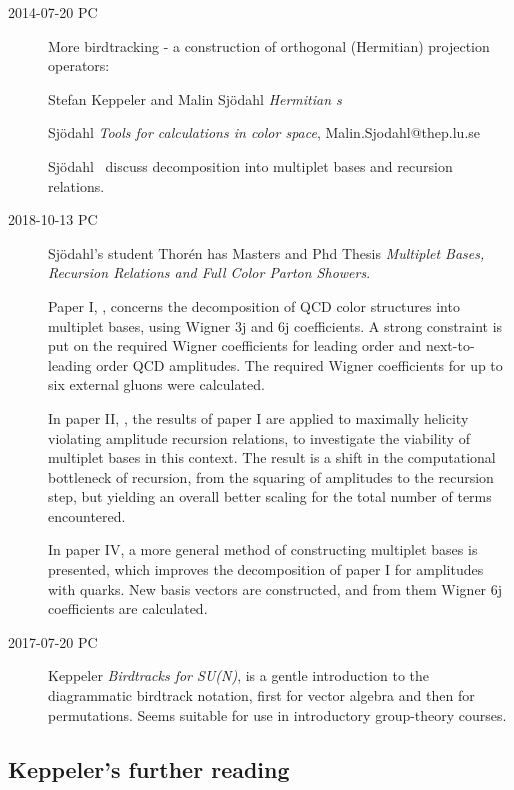 \begin{description}

\item[2014-07-20 PC] More birdtracking - a construction of orthogonal
(Hermitian) projection operators:

{Stefan Keppeler} and Malin Sj{\"o}dahl {\em Hermitian \Ypo s}

Sj{\"o}dahl {\em Tools for calculations in color
space}, Malin.Sjodahl@thep.lu.se

Sj\"odahl \etal\ discuss decomposition into multiplet
  bases and recursion relations.

\item[2018-10-13 PC]
Sj{\"o}dahl's student Thor{\'e}n has Masters and Phd
Thesis
{\em Multiplet Bases, Recursion Relations and Full Color Parton Showers}.

Paper I, , concerns the decomposition of QCD color structures
into multiplet bases, using Wigner 3j and 6j coefficients. A strong constraint
is put on the required Wigner coefficients for leading order and
next-to-leading order QCD amplitudes. The required Wigner coefficients for up
to six external gluons were calculated.

In paper II, , the results of paper I are applied to
maximally helicity violating amplitude recursion relations, to investigate the
viability of multiplet bases in this context. The result is a shift in the
computational bottleneck of recursion, from the squaring of amplitudes to the
recursion step, but yielding an overall better scaling for the total number of
terms encountered.

In paper IV,  a more general method of constructing multiplet
bases is presented, which improves the decomposition of paper I for amplitudes
with quarks. New basis vectors are constructed, and from
them Wigner 6j coefficients are calculated.


\item[2017-07-20 PC] Keppeler
{\em {Birdtracks for SU(N)}},  is
a gentle introduction to the diagrammatic birdtrack notation, first for
vector algebra and then for permutations. Seems suitable for use in
introductory group-theory courses.

\end{description}

\subsection{Keppeler's further reading}

